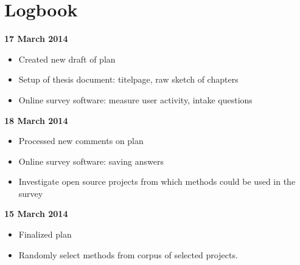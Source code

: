 \section{Logbook}

\textbf{17 March 2014}
\begin{itemize}
	\item Created new draft of plan
	\item Setup of thesis document: titelpage, raw sketch of chapters
	\item Online survey software: measure user activity, intake questions
\end{itemize}
\textbf{18 March 2014}
\begin{itemize}
	\item Processed new comments on plan
	\item Online survey software: saving answers
	\item Investigate open source projects from which methods could be used in the survey
\end{itemize}
\textbf{15 March 2014}
\begin{itemize}
	\item Finalized plan
	\item Randomly select methods from corpus of selected projects.
\end{itemize}